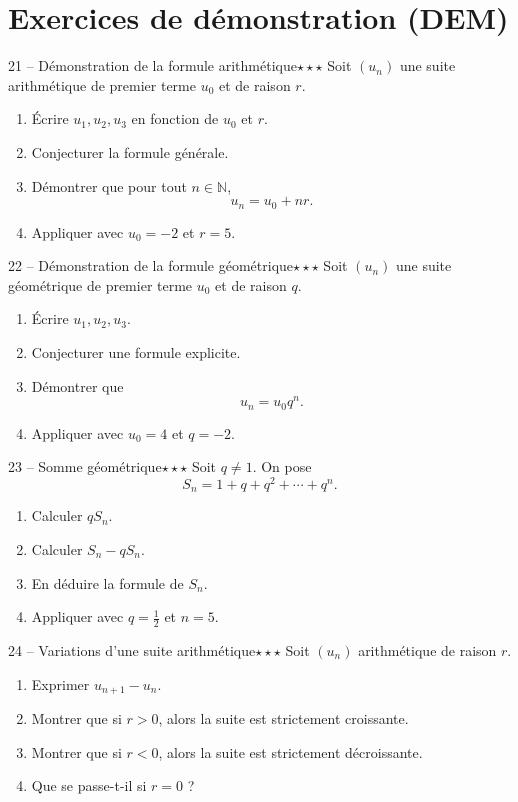 \documentclass[11pt,a4paper]{article}
\newcommand{\N}{\mathbb{N}}
\newcommand{\troisetoiles}{\(\star\star\star\)}
\begin{document}
\section{Exercices de démonstration (DEM)}

\begin{exobox}{21 -- Démonstration de la formule arithmétique}{\troisetoiles}
Soit \((u_n)\) une suite arithmétique de premier terme \(u_0\) et de raison \(r\).
\begin{enumerate}[label=\alph*)]
  \item Écrire \(u_1,u_2,u_3\) en fonction de \(u_0\) et \(r\).
  \item Conjecturer la formule générale.
  \item Démontrer que pour tout \(n\in\N\),
  \[
  u_n=u_0+nr.
  \]
  \item Appliquer avec \(u_0=-2\) et \(r=5\).
\end{enumerate}
\end{exobox}

\begin{exobox}{22 -- Démonstration de la formule géométrique}{\troisetoiles}
Soit \((u_n)\) une suite géométrique de premier terme \(u_0\) et de raison \(q\).
\begin{enumerate}[label=\alph*)]
  \item Écrire \(u_1,u_2,u_3\).
  \item Conjecturer une formule explicite.
  \item Démontrer que
  \[
  u_n=u_0q^n.
  \]
  \item Appliquer avec \(u_0=4\) et \(q=-2\).
\end{enumerate}
\end{exobox}

\begin{exobox}{23 -- Somme géométrique}{\troisetoiles}
Soit \(q\neq 1\). On pose
\[
S_n=1+q+q^2+\cdots+q^n.
\]
\begin{enumerate}[label=\alph*)]
  \item Calculer \(qS_n\).
  \item Calculer \(S_n-qS_n\).
  \item En déduire la formule de \(S_n\).
  \item Appliquer avec \(q=\frac12\) et \(n=5\).
\end{enumerate}
\end{exobox}

\begin{exobox}{24 -- Variations d'une suite arithmétique}{\troisetoiles}
Soit \((u_n)\) arithmétique de raison \(r\).
\begin{enumerate}[label=\alph*)]
  \item Exprimer \(u_{n+1}-u_n\).
  \item Montrer que si \(r>0\), alors la suite est strictement croissante.
  \item Montrer que si \(r<0\), alors la suite est strictement décroissante.
  \item Que se passe-t-il si \(r=0\) ?
\end{enumerate}
\end{exobox}
\end{document}
